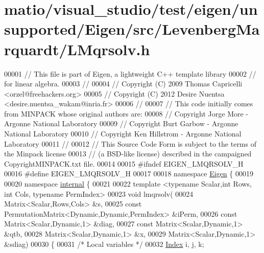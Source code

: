 \hypertarget{matio_2visual__studio_2test_2eigen_2unsupported_2_eigen_2src_2_levenberg_marquardt_2_l_mqrsolv_8h_source}{}\section{matio/visual\+\_\+studio/test/eigen/unsupported/\+Eigen/src/\+Levenberg\+Marquardt/\+L\+Mqrsolv.h}
\label{matio_2visual__studio_2test_2eigen_2unsupported_2_eigen_2src_2_levenberg_marquardt_2_l_mqrsolv_8h_source}

\begin{DoxyCode}
00001 \textcolor{comment}{// This file is part of Eigen, a lightweight C++ template library}
00002 \textcolor{comment}{// for linear algebra.}
00003 \textcolor{comment}{//}
00004 \textcolor{comment}{// Copyright (C) 2009 Thomas Capricelli <orzel@freehackers.org>}
00005 \textcolor{comment}{// Copyright (C) 2012 Desire Nuentsa <desire.nuentsa\_wakam@inria.fr>}
00006 \textcolor{comment}{//}
00007 \textcolor{comment}{// This code initially comes from MINPACK whose original authors are:}
00008 \textcolor{comment}{// Copyright Jorge More - Argonne National Laboratory}
00009 \textcolor{comment}{// Copyright Burt Garbow - Argonne National Laboratory}
00010 \textcolor{comment}{// Copyright Ken Hillstrom - Argonne National Laboratory}
00011 \textcolor{comment}{//}
00012 \textcolor{comment}{// This Source Code Form is subject to the terms of the Minpack license}
00013 \textcolor{comment}{// (a BSD-like license) described in the campaigned CopyrightMINPACK.txt file.}
00014 
00015 \textcolor{preprocessor}{#ifndef EIGEN\_LMQRSOLV\_H}
00016 \textcolor{preprocessor}{#define EIGEN\_LMQRSOLV\_H}
00017 
00018 \textcolor{keyword}{namespace }\hyperlink{namespace_eigen}{Eigen} \{ 
00019 
00020 \textcolor{keyword}{namespace }\hyperlink{namespaceinternal}{internal} \{
00021 
00022 \textcolor{keyword}{template} <\textcolor{keyword}{typename} Scalar,\textcolor{keywordtype}{int} Rows, \textcolor{keywordtype}{int} Cols, \textcolor{keyword}{typename} PermIndex>
00023 \textcolor{keywordtype}{void} lmqrsolv(
00024   Matrix<Scalar,Rows,Cols> &s,
00025   \textcolor{keyword}{const} PermutationMatrix<Dynamic,Dynamic,PermIndex> &iPerm,
00026   \textcolor{keyword}{const} Matrix<Scalar,Dynamic,1> &diag,
00027   \textcolor{keyword}{const} Matrix<Scalar,Dynamic,1> &qtb,
00028   Matrix<Scalar,Dynamic,1> &x,
00029   Matrix<Scalar,Dynamic,1> &sdiag)
00030 \{
00031     \textcolor{comment}{/* Local variables */}
00032     \hyperlink{namespace_eigen_a62e77e0933482dafde8fe197d9a2cfde}{Index} i, j, k;

\end{DoxyCode}
